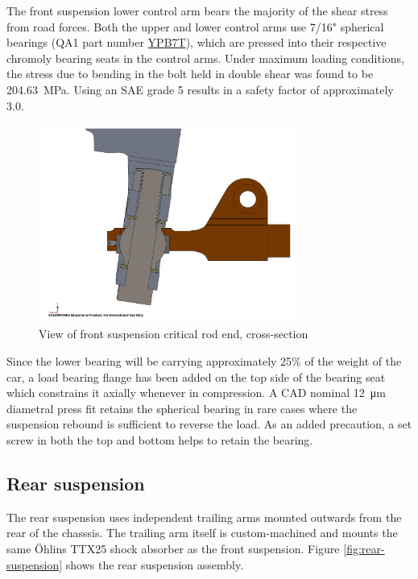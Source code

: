 \documentclass[10pt]{article}
\begin{document}
The front suspension lower control arm bears the majority of the shear stress from road forces. Both the upper and lower control arms use 7/16" spherical bearings (QA1 part number \href{https://www.qa1.net/rod-ends-and-related/spherical-bearings/ypb-t-high-misalignment-stainless-steel-series}{YPB7T}), which are pressed into their respective chromoly bearing seats in the control arms. Under maximum loading conditions, the stress due to bending in the bolt held in double shear was found to be \SI{204.63}{\mega\pascal}. Using an SAE grade 5 results in a safety factor of approximately 3.0.

\begin{figure}
\centering
\includegraphics[width=0.75\textwidth]{figures/front-suspension-cross-section}
\caption{View of front suspension critical rod end, cross-section}
\label{fig:front-suspension-cross-section}
\end{figure}

Since the lower bearing will be carrying approximately 25\% of the weight of the car, a load bearing flange has been added on the top side of the bearing seat which constrains it axially whenever in compression. A CAD nominal \SI{12}{\micro\metre} diametral press fit retains the spherical bearing in rare cases where the suspension rebound is sufficient to reverse the load. As an added precaution, a set screw in both the top and bottom helps to retain the bearing.

\subsection{Rear suspension}
The rear suspension uses independent trailing arms mounted outwards from the rear of the chasssis. The trailing arm itself is custom-machined and mounts the same \"Ohlins TTX25 shock absorber as the front suspension. Figure \ref{fig:rear-suspension} shows the rear suspension assembly.
\end{document}
